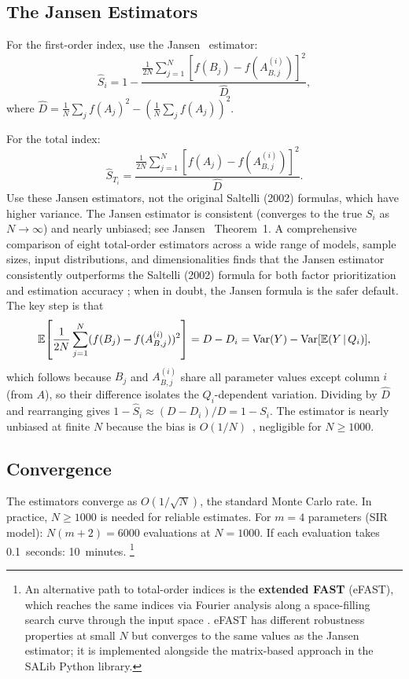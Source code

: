 \subsection{The Jansen Estimators}

For the first-order index, use the Jansen~\cite{jansen1999analysis} estimator:
\begin{equation}
  \hat{S}_i = 1 - \frac{\frac{1}{2N}\sum_{j=1}^N [f(B_j) - f(A_{B,j}^{(i)})]^2}{\hat{D}},
  \label{eq:Jansen_S1}
\end{equation}
where $\hat{D} = \frac{1}{N}\sum_j f(A_j)^2 - \left(\frac{1}{N}\sum_j f(A_j)\right)^2$.

For the total index:
\begin{equation}
  \hat{S}_{T_i} = \frac{\frac{1}{2N}\sum_{j=1}^N [f(A_j) - f(A_{B,j}^{(i)})]^2}{\hat{D}}.
  \label{eq:Jansen_ST}
\end{equation}
Use these Jansen estimators, not the original Saltelli (2002) formulas,
which have higher variance. The Jansen estimator is consistent
(converges to the true $S_i$ as $N\to\infty$) and nearly unbiased;
see Jansen~\cite{jansen1999analysis} Theorem~1.
A comprehensive comparison of eight total-order estimators across a wide
range of models, sample sizes, input distributions, and dimensionalities
finds that the Jansen estimator consistently outperforms the Saltelli
(2002) formula for both factor prioritization and estimation accuracy
\cite{puy2022comprehensive}; when in doubt, the Jansen formula is the
safer default.
The key step is that
\[
  \mathbb{E}\!\left[\frac{1}{2N}\sum_{j=1}^N (f(B_j) - f(A_{B,j}^{(i)}))^2\right]
  = D - D_i = \operatorname{Var}(Y) - \operatorname{Var}[\mathbb{E}(Y\,|\,Q_i)],
\]
which follows because $B_j$ and $A_{B,j}^{(i)}$ share all parameter
values except column $i$ (from $A$), so their difference isolates
the $Q_i$-dependent variation. Dividing by $\hat{D}$ and rearranging
gives $1 - \hat{S}_i \approx (D - D_i)/D = 1 - S_i$.
The estimator is nearly unbiased at finite $N$ because the bias
is $O(1/N)$~\cite{jansen1999analysis}, negligible for $N \geq 1000$.

\subsection{Convergence}

The estimators converge as $O(1/\sqrt{N})$, the standard Monte Carlo rate.
In practice, $N \geq 1000$ is needed for reliable estimates.
For $m = 4$ parameters (SIR model): $N(m+2) = 6000$ evaluations at $N = 1000$.
If each evaluation takes 0.1~seconds: 10~minutes.%
\footnote{An alternative path to total-order indices is the
\textbf{extended FAST} (eFAST), which reaches the same indices via Fourier
analysis along a space-filling search curve through the input space
\cite{saltelli1999effast}.
eFAST has different robustness properties at small $N$ but converges to
the same values as the Jansen estimator; it is implemented alongside the
matrix-based approach in the SALib Python library.}

